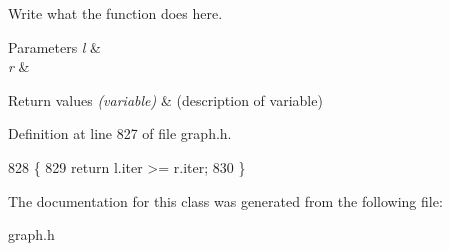 Write what the function does here. 


\begin{DoxyParams}{Parameters}
{\em l} & \\
\hline
{\em r} & \\
\hline
\end{DoxyParams}

\begin{DoxyRetVals}{Return values}
{\em (variable)} & (description of variable) \\
\hline
\end{DoxyRetVals}


Definition at line 827 of file graph.\+h.


\begin{DoxyCode}
828         \{
829             \textcolor{keywordflow}{return} l.iter >= r.iter;
830         \}
\end{DoxyCode}


The documentation for this class was generated from the following file\+:\begin{DoxyCompactItemize}
\item 
graph.\+h\end{DoxyCompactItemize}
